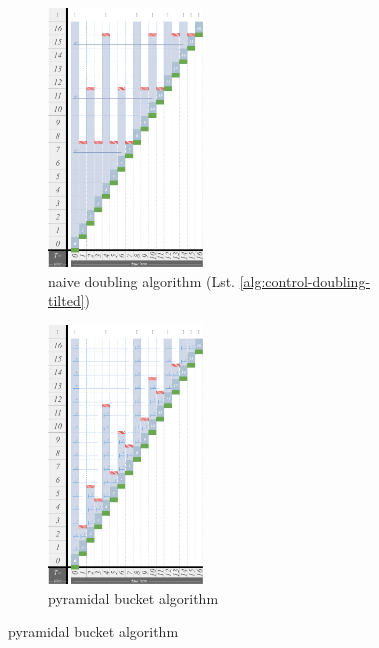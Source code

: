 \begin{figure}
\begin{subfigure}{0.52\linewidth}
\centering
\includegraphics[height=2.7in,width=\linewidth]{img/surface-control-tall-zhao-tilted-doubling-naive-desat50}
\centering
\caption{\footnotesize naive doubling algorithm (Lst. \ref{alg:control-doubling-tilted})}
\label{fig:surface-control-tilted:naive-doubling}
\end{subfigure}
\begin{subfigure}{0.47\linewidth}
\centering
\includegraphics[height=2.7in,width=\linewidth,trim={2.5cm 0 0 0},clip]{img/surface-control-tall-zhao-desat50}
\centering
\caption{\footnotesize pyramidal bucket algorithm \citep{zhao2005generalized}}
\label{fig:surface-control-tilted:pyramidal}
\end{subfigure}


\end{figure}
